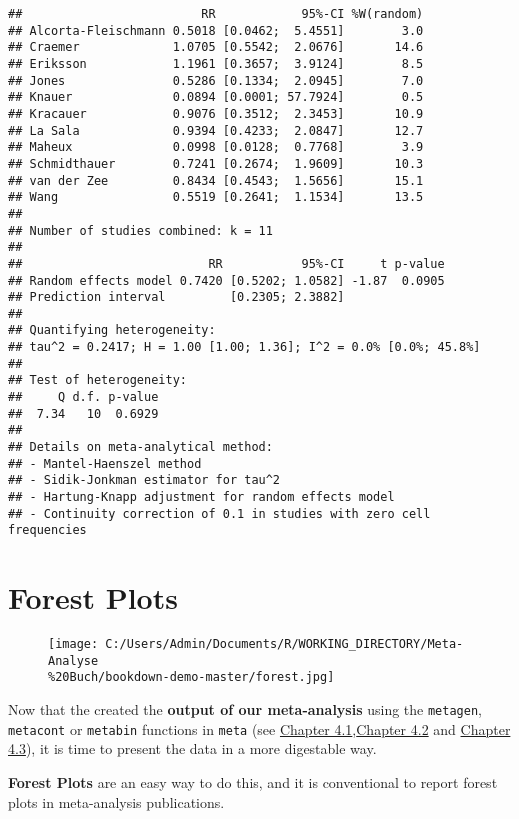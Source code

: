 \documentclass[]{book}
\theoremstyle{definition}
\theoremstyle{definition}
\theoremstyle{definition}
\theoremstyle{remark}
\begin{document}
\begin{verbatim}
##                         RR            95%-CI %W(random)
## Alcorta-Fleischmann 0.5018 [0.0462;  5.4551]        3.0
## Craemer             1.0705 [0.5542;  2.0676]       14.6
## Eriksson            1.1961 [0.3657;  3.9124]        8.5
## Jones               0.5286 [0.1334;  2.0945]        7.0
## Knauer              0.0894 [0.0001; 57.7924]        0.5
## Kracauer            0.9076 [0.3512;  2.3453]       10.9
## La Sala             0.9394 [0.4233;  2.0847]       12.7
## Maheux              0.0998 [0.0128;  0.7768]        3.9
## Schmidthauer        0.7241 [0.2674;  1.9609]       10.3
## van der Zee         0.8434 [0.4543;  1.5656]       15.1
## Wang                0.5519 [0.2641;  1.1534]       13.5
## 
## Number of studies combined: k = 11
## 
##                          RR           95%-CI     t p-value
## Random effects model 0.7420 [0.5202; 1.0582] -1.87  0.0905
## Prediction interval         [0.2305; 2.3882]              
## 
## Quantifying heterogeneity:
## tau^2 = 0.2417; H = 1.00 [1.00; 1.36]; I^2 = 0.0% [0.0%; 45.8%]
## 
## Test of heterogeneity:
##     Q d.f. p-value
##  7.34   10  0.6929
## 
## Details on meta-analytical method:
## - Mantel-Haenszel method
## - Sidik-Jonkman estimator for tau^2
## - Hartung-Knapp adjustment for random effects model
## - Continuity correction of 0.1 in studies with zero cell frequencies
\end{verbatim}

\chapter{Forest Plots}\label{forest-plots}

\begin{figure}
\centering
\texttt{[image: C:/Users/Admin/Documents/R/WORKING\_DIRECTORY/Meta-Analyse\\\%20Buch/bookdown-demo-master/forest.jpg]}
\caption{}
\end{figure}

\begin{rmdinfo}
Now that the created the \textbf{output of our meta-analysis} using the
\texttt{metagen}, \texttt{metacont} or \texttt{metabin} functions in
\texttt{meta} (see \protect\hyperlink{fixed}{Chapter
4.1},\protect\hyperlink{random}{Chapter 4.2} and
\protect\hyperlink{binary}{Chapter 4.3}), it is time to present the data
in a more digestable way.

\textbf{Forest Plots} are an easy way to do this, and it is conventional
to report forest plots in meta-analysis publications.
\end{rmdinfo}
\end{document}
